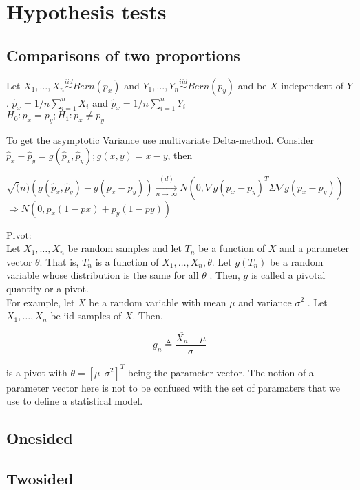 \section{Hypothesis tests}

\subsection*{Comparisons of two proportions}

Let $X_1,\dots ,X_ n \stackrel{iid}{\sim} Bern(p_x)$ and  $Y_1,\dots ,Y_ n \stackrel{iid}{\sim} Bern(p_y)$ and be $X$ independent of $Y$. $\hat{p}_x= 1/n \sum_{i=1}^{n} X_i$ and $\hat{p}_x= 1/n \sum_{i=1}^{n} Y_i$\\

$H_0: p_x = p_y; H_1: p_x \neq p_y$

To get the asymptotic Variance use multivariate Delta-method. Consider $\hat{p}_x - \hat{p}_y = g(\hat{p}_x,\hat{p}_y); g(x,y)= x -y$, then

$\sqrt(n) (g(\hat{p}_x,\hat{p}_y) - g(p_x-p_y)) \xrightarrow[n \rightarrow \infty]{(d)} N(0,\nabla g(p_x-p_y)^T \Sigma \nabla g(p_x-p_y))$\\ 

$\Rightarrow N(0,p_x(1-px) + p_y(1-py))$

Pivot:\\

Let $X_1,\dots ,X_ n$ be random samples and let $T_ n$  be a function of $X$ and a parameter vector $\theta$. That is, $T_n$ is a function of $X_1,\dots ,X_ n,\theta$. Let $g(T_ n)$ be a random variable whose distribution is the same for all $\theta$ . Then, $g$ is called a pivotal quantity or a pivot.\\

For example, let $X$ be a random variable with mean $\mu$ and variance $\sigma^2$ . Let $X_1,\dots ,X_ n$ be iid samples of $X$. Then,

$$\displaystyle  g_ n \triangleq \frac{\overline{X_ n} - \mu }{\sigma }$$
 		 	 
is a pivot with $\theta = \left[\mu ~ ~  \sigma ^2\right]^ T$ being the parameter vector. The notion of a parameter vector here is not to be confused with the set of paramaters that we use to define a statistical model.



\subsection*{Onesided}
\subsection*{Twosided}
